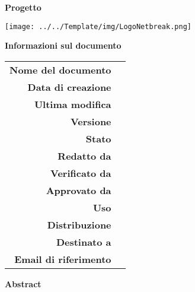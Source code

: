 
\begin{center}



\vspace{4em}

\begin{center} 
	\begin{Huge}
		\textbf{\fontsize{15mm}{20mm}\selectfont \gruppoLink} 
	\end{Huge}
\end{center}

\begin{center}
	\begin{Large}
		\vspace{0.3em}
		\textbf{Progetto \progetto}
	\end{Large}
\end{center}

\texttt{[image: ../../Template/img/LogoNetbreak.png]}

\thispagestyle{empty}

\vfill

\begin{Huge} \textbf{\documento} \end{Huge}

\begin{center}
\large\textbf{Informazioni sul documento} \\ \vspace{2em}
\small
\begin{tabular}{r l}
	\textbf{Nome del documento} & \nomedocumentofisico \\
	\textbf{Data di creazione} & \datacreazione\\
	\textbf{Ultima modifica} & \datamodifica\\
	\textbf{Versione} & \versione\\
	\textbf{Stato} & \stato \\
	\textbf{Redatto da}	& \redazione\\
	\textbf{Verificato da}	& \verifica\\
	\textbf{Approvato da}	& \approvazione\\
	\textbf{Uso}  & \uso\\
	\textbf{Distribuzione} & \gruppo \\
	\textbf{Destinato a}  &  \destinateTo \\
	\textbf{Email di riferimento}  &  \email \\
\end{tabular}
\end{center}

\vspace{2em}

\normalsize
\textbf{Abstract\\} 

\end{center}
\clearpage
